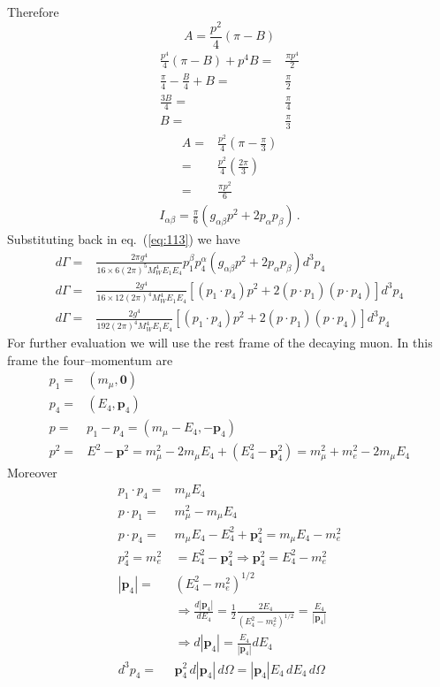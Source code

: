 Therefore
\begin{equation}
  A=\frac{p^2}{4}(\pi-B)
\end{equation}
\begin{align}
  \frac{p^4}{4}(\pi-B)+p^4B=&\frac{\pi p^4}{2}\nonumber\\
    \frac{\pi}{4} -\frac{B}{4}+B=&\frac{\pi}{2}\nonumber\\
    \frac{3B}{4}=&\frac{\pi}{4}\nonumber\\
    B=&\frac{\pi}{3}
\end{align}
\begin{align}
  A=&\frac{p^2}{4}(\pi-\frac{\pi}{3})\nonumber\\
  =&\frac{p^2}{4}(\frac{2\pi}{3})\nonumber\\
  =&\frac{\pi p^2}{6}
\end{align}
\begin{align}
  I_{\alpha\beta}=\frac{\pi}{6}\left(g_{\alpha\beta}p^2+2p_\alpha p_\beta  \right)\,.
\end{align}
Substituting back in eq.~(\ref{eq:113}) we have 
\begin{align}
  \label{eq:117}
  d\Gamma =& \frac{2\pi g^4}{16\times6 (2\pi)^5 M_W^4 E_1 E_4}p_1^\beta p_4^\alpha (g_{\alpha\beta}p^2+2p_\alpha p_\beta)d^3p_4 \nonumber\\
  d\Gamma =& \frac{2g^4}{16\times12 (2\pi)^4 M_W^4 E_1 E_4}[(p_1\cdot p_4)p^2+2(p\cdot p_1)(p\cdot p_4)]d^3p_4 \nonumber\\
  d\Gamma =& \frac{2g^4}{192 (2\pi)^4 M_W^4 E_1 E_4}[(p_1\cdot p_4)p^2+2(p\cdot p_1)(p\cdot p_4)]d^3p_4 
\end{align}
For further evaluation we will use the rest frame of the decaying muon. In this frame the four--momentum are
\begin{align}
  p_1=&(m_\mu,\mathbf{0})\nonumber\\
  p_4=&(E_4,\mathbf{p}_4)\nonumber\\
  p=&p_1-p_4=(m_\mu-E_4,-\mathbf{p}_4)\nonumber\\
  p^2=&E^2-\mathbf{p}^2=m_\mu^2-2m_\mu E_4+(E_4^2-\mathbf{p}_4^2)=m_\mu^2+m_e^2-2m_\mu E_4
\end{align}
Moreover
\begin{align}
  \label{eq:118}
  p_1\cdot p_4=&m_\mu E_4\nonumber\\
  p\cdot p_1=&m_\mu^2-m_\mu E_4\nonumber\\
  p\cdot p_4=&m_\mu E_4-E_4^2+\mathbf{p}_4^2=m_\mu E_4-m_e^2\nonumber\\
  p_4^2=m_e^2&=E_4^2-\mathbf{p}_4^2\Rightarrow\mathbf{p}_4^2=E_4^2-m_e^2\nonumber\\
  |\mathbf{p}_4| =&(E_4^2-m_e^2)^{1/2}\nonumber\\
  &\Rightarrow\frac{d|\mathbf{p}_4|}{d E_4}=\frac{1}{2}\frac{2E_4}{(E_4^2-m_e^2)^{1/2}}=\frac{E_4}{|\mathbf{p}_4|}\nonumber\\
  &\Rightarrow d|\mathbf{p}_4|=\frac{E_4}{|\mathbf{p}_4|} d E_4\nonumber\\
  d^3p_4=&\mathbf{p}_4^2 \,d |\mathbf{p}_4|\,d\Omega=|\mathbf{p}_4|E_4\,d E_4\, d\Omega
\end{align}
